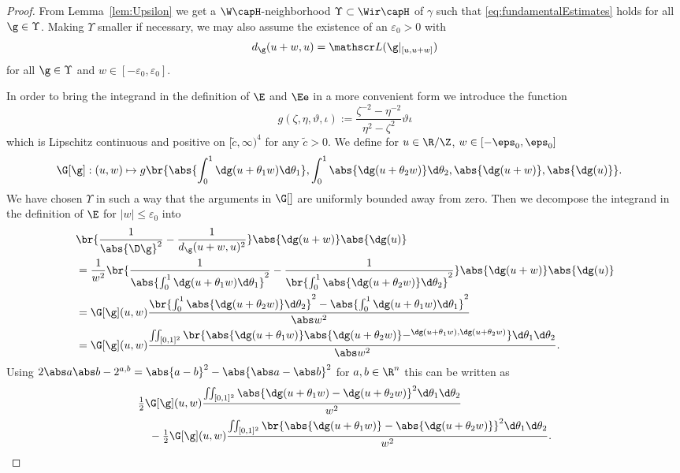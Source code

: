 \begin{proof}
 From Lemma~\ref{lem:Upsilon} we get a $\W \capH$-neighborhood
 $\Upsilon \subset \Wir \capH$ of $\gamma$ such that
 \eqref{eq:fundamentalEstimates} holds for all $\g\in\Upsilon$.
 Making $\Upsilon$ smaller if
 necessary, we may also assume the existence of an $\varepsilon_0 >0$ with
 \begin{equation*}
  d_{\g}(u+w,u) = \mathscr L (\g|_{[u,u+w]})
 \end{equation*}
 for all $\g \in \Upsilon$ and  $w \in [-\varepsilon_0, \varepsilon_0]$.

 \renewcommand{\gt}{\tg}
 \renewcommand{\dgt}{\tg'} 
 In order to bring the integrand in the definition of $\E$ and $\Ee$
 in a more convenient form we
 introduce the function
 \[ g(\zeta,\eta,\vartheta,\iota) := \frac{\zeta^{-2}-\eta^{-2}}{\eta^2-\zeta^2}\vartheta\iota \]
 which is Lipschitz continuous and positive on $[\tilde c,\infty)^4$ for any $\tilde c>0$.
 We define for $u\in\R/\Z$, $w\in[-\eps_0,\eps_0]$
 \begin{align*}
  \G[\g]:(u,w) &\mapsto g\br{\abs{\int_0^1\dg(u+\theta_1w)\d\theta_1},\int_0^1\abs{\dg(u+\theta_2w)}\d\theta_2,\abs{\dg(u+w)},\abs{\dg(u)}}.
 \end{align*}
 We have chosen $\Upsilon$ in such a way that the arguments in $\G[]$ are 
 uniformly bounded away from zero.
 Then we decompose the integrand in the definition of $\E$ for $|w| \leq \varepsilon_0$ into
 \begin{align*}
  &\br{\frac1{\abs{\D\g}^2}-\frac1{d_{\g}(u+w,u)^2}}\abs{\dg(u+w)}\abs{\dg(u)}\\
  &=\frac1{w^2}\br{\frac1{\abs{\int_0^1\dg(u+\theta_1w)\d\theta_1}^2}-\frac1{\br{\int_0^1\abs{\dg(u+\theta_2w)}\d\theta_2}^2}}\abs{\dg(u+w)}\abs{\dg(u)}\\
  &=\G[\g](u,w)\frac{\br{\int_0^1 \abs{\dg(u+\theta_2w)}\d\theta_2}^2 - \abs{\int_0^1\dg(u+\theta_1w)\d\theta_1}^2}{\abs w^{2}}  \\
  &=\G[\g](u,w)\frac{\iint_{[0,1]^2} \br{\abs{\dg(u+\theta_1w)}\abs{\dg(u+\theta_2w)} - \sp{\dg(u+\theta_1w),\dg(u+\theta_2w)}} \d\theta_1\d\theta_2}{\abs w^{2}}.
 \end{align*}
 Using $2\abs a\abs b-2\sp{a,b} = \abs{a-b}^2 - \abs{\abs a-\abs b}^2$ for $a,b\in\R^n$ 
 this can be written as
 \begin{align*}
  &\tfrac12 \G[\g](u,w)\frac{\iint_{[0,1]^2}\abs{\dg(u+\theta_1w)-\dg(u+\theta_2w)}^2\d\theta_1\d\theta_2}{w^2} \\
  &\quad{}-\tfrac12 \G[\g](u,w)\frac{\iint_{[0,1]^2}\br{\abs{\dg(u+\theta_1w)}-\abs{\dg(u+\theta_2w)}}^2\d\theta_1\d\theta_2}{w^2}.

\end{align*}
\end{proof}
